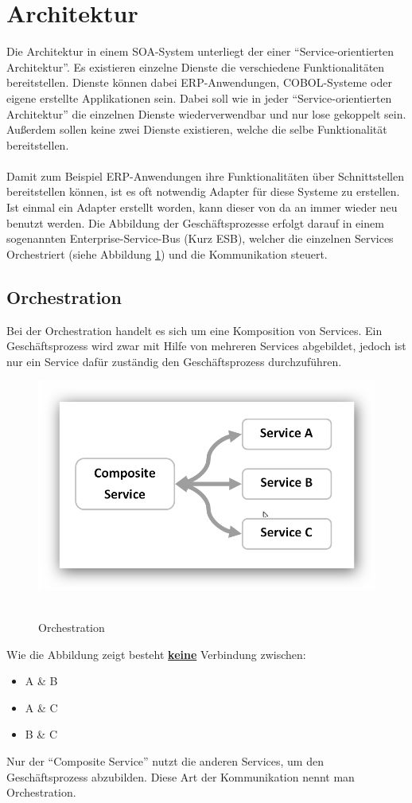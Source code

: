 \section{Architektur}
\label{sec:SoaArchitektur}
Die Architektur in einem SOA-System unterliegt der einer "`Service-orientierten Architektur"'. Es existieren einzelne Dienste die verschiedene Funktionalitäten bereitstellen. Dienste können dabei ERP-Anwendungen, COBOL-Systeme oder eigene erstellte Applikationen sein. Dabei soll wie in jeder "`Service-orientierten Architektur"' die einzelnen Dienste wiederverwendbar und nur lose gekoppelt sein. Außerdem sollen keine zwei Dienste existieren, welche die selbe Funktionalität bereitstellen.
\\\\
Damit zum Beispiel ERP-Anwendungen ihre Funktionalitäten über Schnittstellen bereitstellen können, ist es oft notwendig Adapter für diese Systeme zu erstellen. Ist einmal ein Adapter erstellt worden, kann dieser von da an immer wieder neu benutzt werden. Die Abbildung der Geschäftsprozesse erfolgt darauf in einem sogenannten Enterprise-Service-Bus (Kurz ESB), welcher die einzelnen Services Orchestriert (siehe Abbildung \ref{fig:ServiceOrchestration}) und die Kommunikation steuert.

\subsection{Orchestration}
\label{subsec:orchestration}
Bei der Orchestration handelt es sich um eine Komposition von Services. Ein Geschäftsprozess wird zwar mit Hilfe von mehreren Services abgebildet, jedoch ist nur ein Service dafür zuständig den Geschäftsprozess durchzuführen.
\newpage
\begin{figure}[htb]
    \centering 
    \includegraphics[width=\linewidth]{content/images/ServiceOrchestration}\
    \caption[Orchestration]{Orchestration}
    \label{fig:ServiceOrchestration}  
\end{figure}
\noindent
Wie die Abbildung zeigt besteht \textbf{\underline{keine}} Verbindung zwischen:
\begin{itemize}
    \item A \& B
    \item A \& C
    \item B \& C
\end{itemize}
Nur der "`Composite Service"' nutzt die anderen Services, um den Geschäftsprozess abzubilden. Diese Art der Kommunikation nennt man Orchestration.

